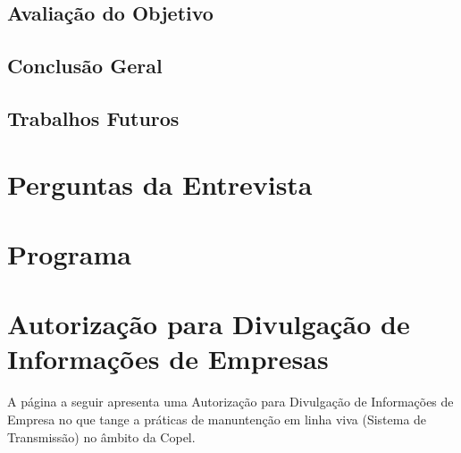 \documentclass[openright]{normas-utf-tex} %
\begin{document}
	\section{Avaliação do Objetivo}
		
	\section{Conclusão Geral}
		
	\section{Trabalhos Futuros}
		

\clearpage %
\label{bibstart}
\label{bibend}

\apendice

\chapter{Perguntas da Entrevista}
\label{pergunta}


\chapter{Programa}
\label{program}


\chapter{Autorização para Divulgação de Informações de Empresas}

A página a seguir apresenta uma Autorização para Divulgação de Informações de Empresa no que tange a práticas de manuntenção em linha viva (Sistema de Transmissão) no âmbito da Copel.


\end{document}
